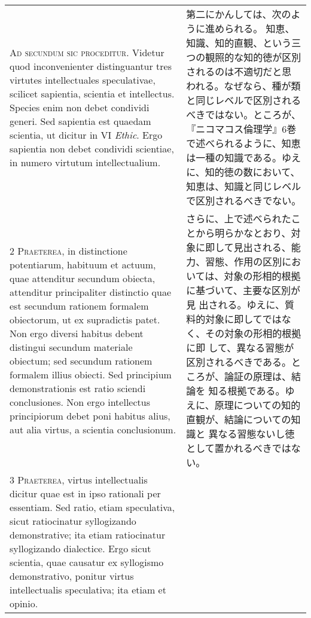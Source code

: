 \documentclass[10pt]{jsarticle} %
\begin{document}
\begin{longtable}{p{21em}p{21em}}


{\huge A}{\scshape d secundum sic proceditur}. Videtur quod
 inconvenienter distinguantur tres virtutes intellectuales speculativae,
 scilicet sapientia, scientia et intellectus. Species enim non debet
 condividi generi. Sed sapientia est quaedam scientia, ut dicitur in VI
 {\itshape Ethic}. Ergo sapientia non debet condividi scientiae, in
 numero virtutum intellectualium.

&
第二にかんしては、次のように進められる。
知恵、知識、知的直観、という三つの観照的な知的徳が区別されるのは不適切だと思
 われる。なぜなら、種が類と同じレベルで区別されるべきではない。ところが、
 『ニコマコス倫理学』6巻で述べられるように、知恵は一種の知識である。ゆえ
 に、知的徳の数において、知恵は、知識と同じレベルで区別されるべきでない。

\\



{\scshape 2 Praeterea}, in distinctione
 potentiarum, habituum et actuum, quae attenditur secundum obiecta,
 attenditur principaliter distinctio quae est secundum rationem formalem
 obiectorum, ut ex supradictis patet. Non ergo diversi habitus debent
 distingui secundum materiale obiectum; sed secundum rationem formalem
 illius obiecti. Sed principium demonstrationis est ratio sciendi
 conclusiones. Non ergo intellectus principiorum debet poni habitus
 alius, aut alia virtus, a scientia conclusionum.

&
さらに、上で述べられたことから明らかなとおり、対象に即して見出される、能
 力、習態、作用の区別においては、対象の形相的根拠に基づいて、主要な区別が見
 出される。ゆえに、質料的対象に即してではなく、その対象の形相的根拠に即
 して、異なる習態が区別されるべきである。ところが、論証の原理は、結論を
 知る根拠である。ゆえに、原理についての知的直観が、結論についての知識と
 異なる習態ないし徳として置かれるべきではない。


\\



{\scshape 3 Praeterea}, virtus intellectualis
 dicitur quae est in ipso rationali per essentiam. Sed ratio, etiam
 speculativa, sicut ratiocinatur syllogizando demonstrative; ita etiam
 ratiocinatur syllogizando dialectice. Ergo sicut scientia, quae
 causatur ex syllogismo demonstrativo, ponitur virtus intellectualis
 speculativa; ita etiam et opinio.

&


\end{longtable}
\end{document}
